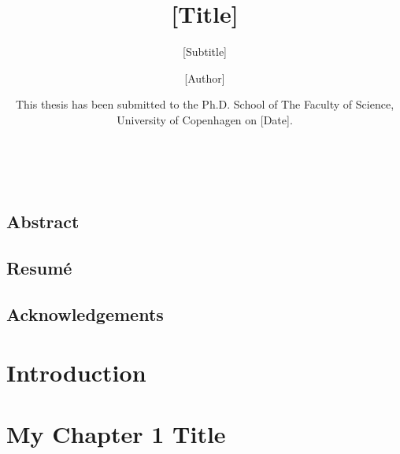 \documentclass[12pt, oneside]{book}
\author{[Author]}
\title{[Title]}
\subtitle{[Subtitle]}
\date{This thesis has been submitted to the Ph.D. School of The Faculty of Science, University of Copenhagen on [Date].}
\renewcommand{\headrulewidth}{0pt}
\newcommand\mymainpagestyle{%
\fancyhf{}      
\fancyhead[L]{\nouppercase{\footnotesize{\chaptername~ \thechapter~ |~ \leftmark}} \renewcommand{\headrulewidth}{0.4pt} \headrule \renewcommand{\headrulewidth}{0pt}}
\setlength{\headheight}{25pt}
\fancyfoot[C]{\thepage}
}
\begin{document}


\maketitle
\frontmatter %
\pagestyle{plain} %

\newpage \ \newpage %

\section*{Abstract}
\label{sec:abstract}


\newpage
\section*{Resumé}
\label{sec:resume}


\newpage
\section*{Acknowledgements}
\label{sec:acks}

\newpage
\tableofcontents
\newpage


\mainmatter 
\mymainpagestyle{} %

\chapter{Introduction}
\label{chap:intro}



\chapter{My Chapter 1 Title}
\label{chap:chap1}

\end{document}
